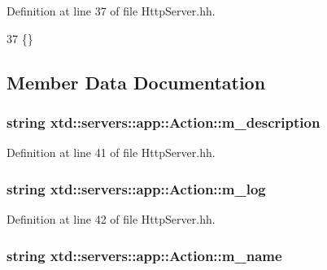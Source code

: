 Definition at line 37 of file Http\+Server.\+hh.


\begin{DoxyCode}
37 \{\}
\end{DoxyCode}


\subsection{Member Data Documentation}
\subsubsection[{\texorpdfstring{m\+\_\+description}{m_description}}]{\setlength{\rightskip}{0pt plus 5cm}string xtd\+::servers\+::app\+::\+Action\+::m\+\_\+description}\hypertarget{classxtd_1_1servers_1_1app_1_1Action_a78d15b580f1f537cc273f05500a823e8}{}\label{classxtd_1_1servers_1_1app_1_1Action_a78d15b580f1f537cc273f05500a823e8}


Definition at line 41 of file Http\+Server.\+hh.

\subsubsection[{\texorpdfstring{m\+\_\+log}{m_log}}]{\setlength{\rightskip}{0pt plus 5cm}string xtd\+::servers\+::app\+::\+Action\+::m\+\_\+log}\hypertarget{classxtd_1_1servers_1_1app_1_1Action_a8ac7e4975e2fde1bb9237454bd99faec}{}\label{classxtd_1_1servers_1_1app_1_1Action_a8ac7e4975e2fde1bb9237454bd99faec}


Definition at line 42 of file Http\+Server.\+hh.

\subsubsection[{\texorpdfstring{m\+\_\+name}{m_name}}]{\setlength{\rightskip}{0pt plus 5cm}string xtd\+::servers\+::app\+::\+Action\+::m\+\_\+name}\hypertarget{classxtd_1_1servers_1_1app_1_1Action_a397748b5fd8412efcf779978ed4f4eef}{}\label{classxtd_1_1servers_1_1app_1_1Action_a397748b5fd8412efcf779978ed4f4eef}


